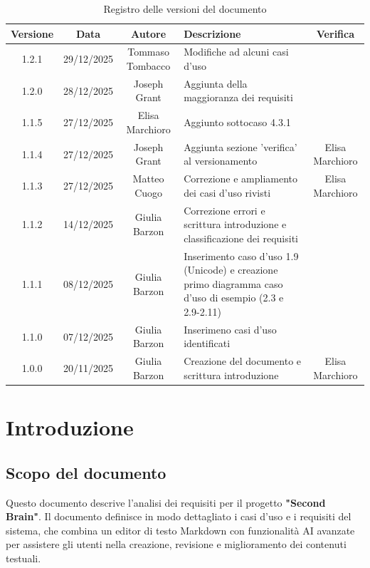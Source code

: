 \documentclass[11pt,a4paper]{article}
\begin{document}
\begin{table}[H]
    \centering
    \begin{tabular}{|c|c|c|>{\raggedright\arraybackslash}p{}|c|}
        \hline
        \textbf{Versione} & \textbf{Data} & \textbf{Autore} & \textbf{Descrizione} & \textbf{Verifica} \\
        \hline
        1.2.1 & 29/12/2025 & Tommaso Tombacco & Modifiche ad alcuni casi d'uso &  \\ 
        \hline
        1.2.0 & 28/12/2025 & Joseph Grant & Aggiunta della maggioranza dei requisiti &  \\ 
        \hline
        1.1.5 & 27/12/2025 & Elisa Marchioro & Aggiunto sottocaso 4.3.1 & \\ 
        \hline
        1.1.4 & 27/12/2025 & Joseph Grant & Aggiunta sezione 'verifica' al versionamento & Elisa Marchioro\\ 
        \hline
        1.1.3 & 27/12/2025 & Matteo Cuogo & Correzione e ampliamento dei casi d'uso rivisti & Elisa Marchioro\\
        \hline
        1.1.2 & 14/12/2025 & Giulia Barzon & Correzione errori e scrittura introduzione e classificazione dei requisiti &\\
        \hline
        1.1.1 & 08/12/2025 & Giulia Barzon & Inserimento caso d'uso 1.9 (Unicode) e creazione primo diagramma caso d'uso di esempio (2.3 e 2.9-2.11) &\\
        \hline
        1.1.0 & 07/12/2025 & Giulia Barzon & Inserimeno casi d'uso identificati & \\
        \hline
        1.0.0 & 20/11/2025 & Giulia Barzon & Creazione del documento e scrittura introduzione & Elisa Marchioro\\
        \hline
    \end{tabular}
    \caption{Registro delle versioni del documento}
    \label{tab:versionamento}
\end{table}

\newpage

\tableofcontents
\thispagestyle{empty}
\newpage

\setcounter{page}{1}

\section{Introduzione}
\subsection{Scopo del documento}
Questo documento descrive l'analisi dei requisiti per il progetto \textbf{"Second Brain"}. Il documento definisce in modo dettagliato i casi d'uso e i requisiti del sistema, che combina un editor di testo Markdown con funzionalità AI avanzate per assistere gli utenti nella creazione, revisione e miglioramento dei contenuti testuali.
\end{document}
